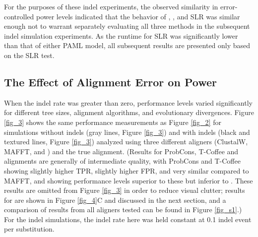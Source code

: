 

For the purposes of these indel experiments, the observed similarity in
error-controlled power levels indicated that the behavior of \mtwo,
\meight, and SLR was similar enough not to warrant separately
evaluating all three methods in the subsequent indel simulation
experiments. As the runtime for SLR was significantly lower than that
of either PAML model, all subsequent results are presented only based
on the SLR test.

\subsection{The Effect of Alignment Error on \Sw Power}

When the indel rate was greater than zero, performance levels varied
significantly for different tree sizes, alignment algorithms, and
evolutionary divergences. Figure \ref{fig_3} shows the same
performance measurements as Figure \ref{fig_2} for simulations without
indels (gray lines, Figure \ref{fig_3}) and with indels (black and
textured lines, Figure \ref{fig_3}) analyzed using three different
aligners (ClustalW, MAFFT, and \prankc) and the true
alignment. (Results for ProbCons, T-Coffee and \pranka alignments are
generally of intermediate quality, with ProbCons and T-Coffee showing
slightly higher TPR, slightly higher FPR, and very similar \tpr{}
compared to MAFFT, and \pranka showing performance levels superior to
these but inferior to \prankc. These results are omitted from Figure
\ref{fig_3} in order to reduce visual clutter; \tpr results for
\pranka are shown in Figure \ref{fig_4}C and discussed in the next
section, and a comparison of results from all aligners tested can be
found in Figure \ref{fig_s1}.) For the indel simulations, the indel
rate here was held constant at 0.1 indel event per substitution.

